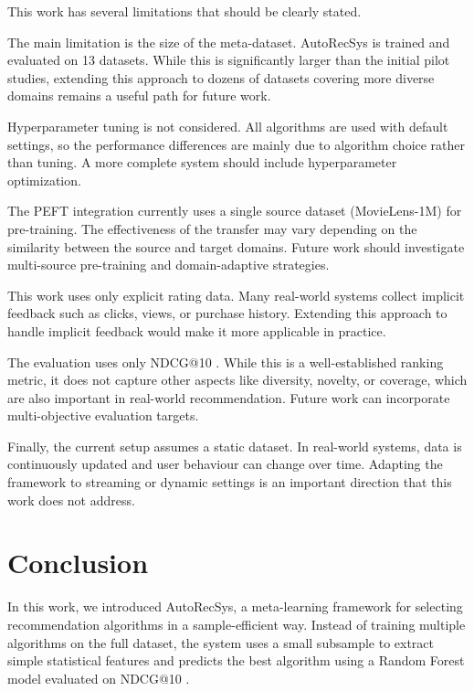 \documentclass[conference]{IEEEtran}
\begin{document}
This work has several limitations that should be clearly stated.

The main limitation is the size of the meta-dataset. AutoRecSys is trained and evaluated on 13 datasets. While this is significantly larger than the initial pilot studies, extending this approach to dozens of datasets covering more diverse domains remains a useful path for future work.

Hyperparameter tuning is not considered. All algorithms are used with default settings, so the performance differences are mainly due to algorithm choice rather than tuning. A more complete system should include hyperparameter optimization.

The PEFT integration currently uses a single source dataset (MovieLens-1M) for pre-training. The effectiveness of the transfer may vary depending on the similarity between the source and target domains. Future work should investigate multi-source pre-training and domain-adaptive strategies.

This work uses only explicit rating data. Many real-world systems collect implicit feedback such as clicks, views, or purchase history. Extending this approach to handle implicit feedback would make it more applicable in practice.

The evaluation uses only NDCG@10 \cite{jarvelin2002ndcg}. While this is a well-established ranking metric, it does not capture other aspects like diversity, novelty, or coverage, which are also important in real-world recommendation. Future work can incorporate multi-objective evaluation targets.

Finally, the current setup assumes a static dataset. In real-world systems, data is continuously updated and user behaviour can change over time. Adapting the framework to streaming or dynamic settings is an important direction that this work does not address.

\section{Conclusion}

In this work, we introduced AutoRecSys, a meta-learning framework for selecting recommendation algorithms in a sample-efficient way. Instead of training multiple algorithms on the full dataset, the system uses a small subsample to extract simple statistical features and predicts the best algorithm using a Random Forest model evaluated on NDCG@10 \cite{jarvelin2002ndcg}.
\end{document}
